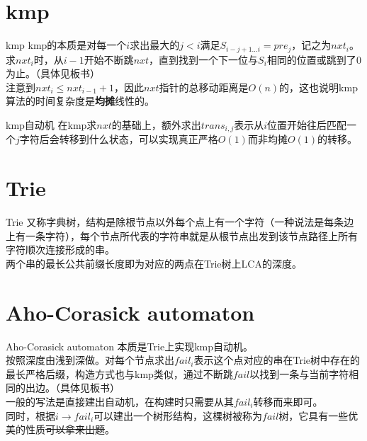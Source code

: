 \documentclass{beamer}
\begin{document}
	\section{kmp}
	\begin{frame}{kmp}
		kmp的本质是对每一个$i$求出最大的$j<i$满足$S_{i-j+1...i}=pre_j$，记之为$nxt_i$。
		\pause\\
		
		求$nxt_i$时，从$i-1$开始不断跳$nxt$，直到找到一个下一位与$S_i$相同的位置或跳到了$0$为止。（具体见板书）
		\pause\\
		
		注意到$nxt_i \le nxt_{i-1}+1$，因此$nxt$指针的总移动距离是$O(n)$的，这也说明kmp算法的时间复杂度是\textbf{均摊}线性的。
	\end{frame}
	\begin{frame}{kmp自动机}
		在kmp求$nxt$的基础上，额外求出$trans_{i,j}$表示从$i$位置开始往后匹配一个$j$字符后会转移到什么状态，可以实现真正严格$O(1)$而非均摊$O(1)$的转移。
	\end{frame}
	\section{Trie}
	\begin{frame}{Trie}
		又称字典树，结构是除根节点以外每个点上有一个字符（一种说法是每条边上有一条字符），每个节点所代表的字符串就是从根节点出发到该节点路径上所有字符顺次连接形成的串。
		\pause\\
		
		两个串的最长公共前缀长度即为对应的两点在Trie树上LCA的深度。
	\end{frame}
	\section{Aho-Corasick automaton}
	\begin{frame}{Aho-Corasick automaton}
		本质是Trie上实现kmp自动机。
		\pause\\
		
		按照深度由浅到深做。对每个节点求出$fail_i$表示这个点对应的串在Trie树中存在的最长严格后缀，构造方式也与kmp类似，通过不断跳$fail$以找到一条与当前字符相同的出边。（具体见板书）
		\pause\\
		
		一般的写法是直接建出自动机，在构建时只需要从其$fail_i$转移而来即可。
		\pause\\
		
		同时，根据$i \to fail_i$可以建出一个树形结构，这棵树被称为$fail$树，它具有一些优美的性质\sout{可以拿来出题}。
	\end{frame}
\end{document}
